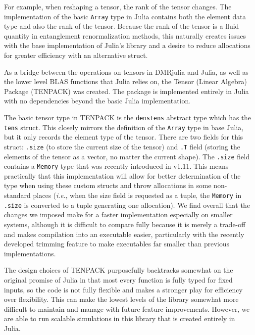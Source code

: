 \documentclass{juliacon}
\begin{document}
For example, when reshaping a tensor, the rank of the tensor changes. The implementation of the basic {\tt Array} type in Julia contains both the element data type and also the rank of the tensor. Because the rank of the tensor is a fluid quantity in entanglement renormalization methods, this naturally creates issues with the base implementation of Julia's library and a desire to reduce allocations for greater efficiency with an alternative struct.

As a bridge between the operations on tensors in DMRjulia and Julia, as well as the lower level BLAS functions that Julia relies on, the Tensor (Linear Algebra) Package (TENPACK) was created. The package is implemented entirely in Julia with no dependencies beyond the basic Julia implementation.

The basic tensor type in TENPACK is the {\tt denstens} abstract type which has the {\tt tens} struct. This closely mirrors the definition of the {\tt Array} type in base Julia, but it only records the element type of the tensor. There are two fields for this struct: {\tt .size} (to store the current size of the tensor) and {\tt .T} field (storing the elements of the tensor as a vector, no matter the current shape). The {\tt .size} field contains a {\tt Memory} type that was recently introduced in v1.11. This means practically that this implementation will allow for better determination of the type when using these custom structs and throw allocations in some non-standard places ({\it i.e.}, when the size field is requested as a tuple, the {\tt Memory} in {\tt .size} is converted to a tuple generating one allocation). We find overall that the changes we imposed make for a faster implementation especially on smaller systems, although it is difficult to compare fully because it is merely a trade-off and makes compilation into an executable easier, particularly with the recently developed trimming feature to make executables far smaller than previous implementations.

The design choices of TENPACK purposefully backtracks somewhat on the original promise of Julia in that most every function is fully typed for fixed inputs, so the code is not fully flexible and makes a stronger play for efficiency over flexibility. This can make the lowest levels of the library somewhat more difficult to maintain and manage with future feature improvements. However, we are able to run scalable simulations in this library that is created entirely in Julia.
\end{document}
